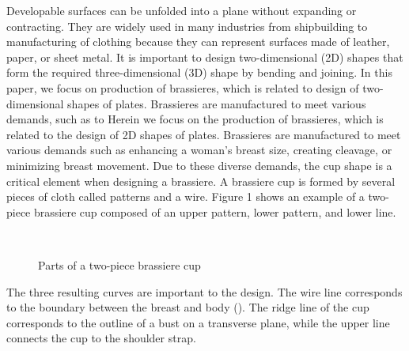 \documentclass[E]{scitrans}
\begin{document}
Developable surfaces can be unfolded into a plane without expanding or contracting. They are widely used in many industries from shipbuilding to manufacturing of clothing because they can represent surfaces made of leather, paper, or sheet metal. It is important to design two-dimensional (2D) shapes that form the required three-dimensional (3D) shape by bending and joining. In this paper, we focus on production of brassieres, which is related to design of two-dimensional shapes of plates. 
Brassieres are manufactured to meet various demands, such as to Herein we focus on the production of brassieres, which is related to the design of 2D shapes of plates. Brassieres are manufactured to meet various demands such as enhancing a woman’s breast size, creating cleavage, or minimizing breast movement. Due to these diverse demands, the cup shape is a critical element when designing a brassiere. A brassiere cup is formed by several pieces of cloth called patterns and a wire. Figure 1 shows an example of a two-piece brassiere cup composed of an upper pattern, lower pattern, and lower line. 
\begin{figure}[h!]
	\centering
	\hfil
	\\
	\caption{Parts of a two-piece brassiere cup}
	\label{fig:patterns}
\end{figure}
 The three resulting curves are important to the design. The wire line corresponds to the boundary between the breast and body (). The ridge line of the cup corresponds to the outline of a bust on a transverse plane, while the upper line connects the cup to the shoulder strap.  
\end{document}
